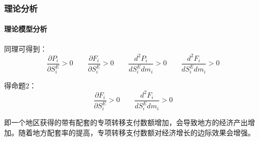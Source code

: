 
\begin{frame}[t]
	\frametitle{理论分析}
	\framesubtitle{理论模型分析}
	\begin{small}	
		同理可得到：
		\[
		\frac{\partial P_i}{\partial S_i^E}>0\qquad\frac{\partial F_i}{\partial S_i^E}>0\qquad\frac{d^2P_i}{dS_i^E dm_i}>0\qquad\frac{d^2F_i}{dS_i^E dm_i}>0
		\]
		
		得命题2：
		\[
		\frac{\partial F_i}{\partial S_i^E}>0\qquad\frac{d^2F_i}{dS_i^E dm_i}>0
		\]		
		
		即一个地区获得的带有配套的专项转移支付数额增加，会导致地方的经济产出增加。随着地方配套率的提高，专项转移支付数额对经济增长的边际效果会增强。
	\end{small}
\end{frame}

